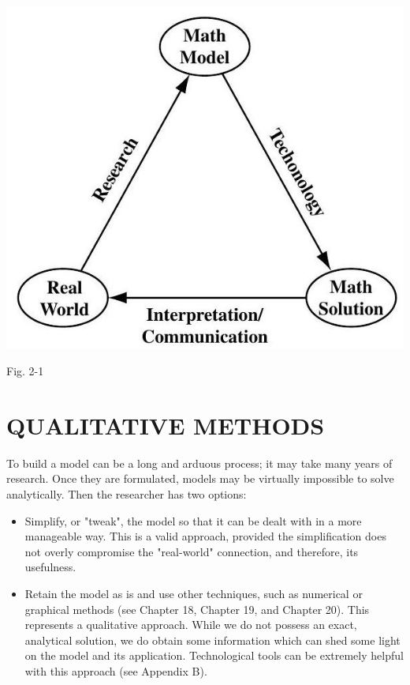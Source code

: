 \documentclass[10pt]{article}
\begin{document}
\begin{center}
\includegraphics[max width=\textwidth]{2024_04_03_5bb5b4275a64cb9887d1g-028}
\end{center}

Fig. 2-1

\section*{QUALITATIVE METHODS}
To build a model can be a long and arduous process; it may take many years of research. Once they are formulated, models may be virtually impossible to solve analytically. Then the researcher has two options:

\begin{itemize}
  \item Simplify, or "tweak", the model so that it can be dealt with in a more manageable way. This is a valid approach, provided the simplification does not overly compromise the "real-world" connection, and therefore, its usefulness.
  \item Retain the model as is and use other techniques, such as numerical or graphical methods (see Chapter 18, Chapter 19, and Chapter 20). This represents a qualitative approach. While we do not possess an exact, analytical solution, we do obtain some information which can shed some light on the model and its application. Technological tools can be extremely helpful with this approach (see Appendix B).
\end{itemize}
\end{document}
